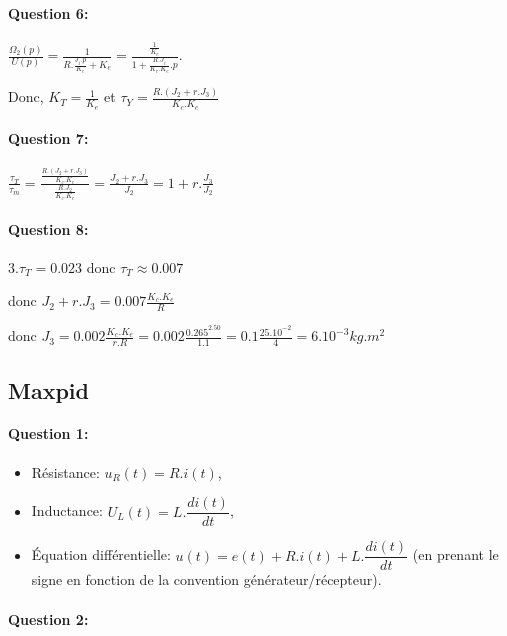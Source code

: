 \paragraph{Question 6:}

$\frac{\Omega_2(p)}{U(p)}=\frac{1}{R.\frac{J_i.p}{K_c}+K_e}=\frac{\frac{1}{K_e}}{1+\frac{R.J_i}{K_c.K_e}.p}$.

Donc, $K_T=\frac{1}{K_e}$ et $\tau_Y=\frac{R.\left(J_2+r.J_3\right)}{K_c.K_e}$

\paragraph{Question 7:}

$\frac{\tau_T}{\tau_m}=\frac{\frac{R.\left(J_2+r.J_3\right)}{K_c.K_e}}{\frac{R.J_2}{K_c.K_e}}=\frac{J_2+r.J_3}{J_2}=1+r.\frac{J_3}{J_2}$

\paragraph{Question 8:}

$3.\tau_T=0.023$ donc $\tau_T\approx 0.007$

donc $J_2+r.J_3=0.007\frac{K_c.K_e}{R}$

donc $J_3=0.002\frac{K_c.K_e}{r.R}=0.002\frac{0.265^2.50}{1.1}=0.1\frac{25.10^{-2}}{4}=6.10^{-3}kg.m^2$

\subsection{Maxpid}

\paragraph{Question 1:}

\begin{itemize}
 \item Résistance: $u_R(t)=R.i(t)$,
 \item Inductance: $U_L(t)=L.\dfrac{di(t)}{dt}$,
 \item Équation différentielle: $u(t)=e(t)+R.i(t)+L.\dfrac{di(t)}{dt}$ (en prenant le signe en fonction de la convention générateur/récepteur).
\end{itemize}

\paragraph{Question 2:}

